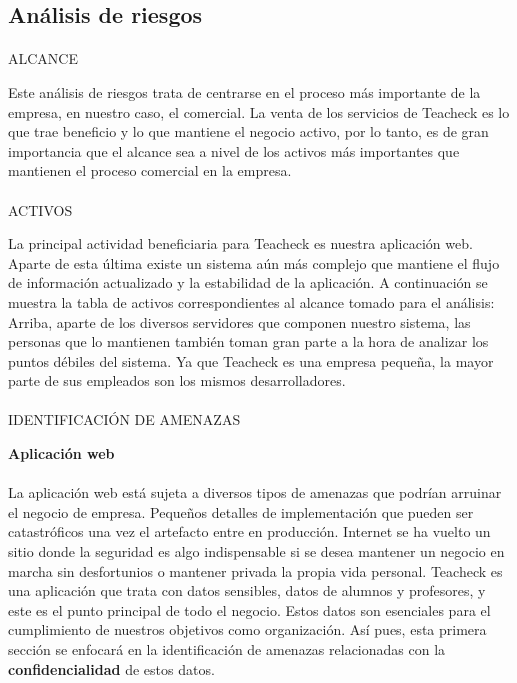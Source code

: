 \subsection{Análisis de riesgos}
\nocite{incibeAnalisisderiesgos}
\paragraph{}
ALCANCE

Este análisis de riesgos trata de centrarse en el proceso más
importante de la empresa, en nuestro caso, el comercial. La venta de
los servicios de Teacheck es lo que trae beneficio y lo que mantiene
el negocio activo, por lo tanto, es de gran importancia que el alcance
sea a nivel de los activos más importantes que mantienen el proceso
comercial en la empresa.

\paragraph{}
ACTIVOS

La principal actividad beneficiaria para Teacheck es nuestra
aplicación web. Aparte de esta última existe un sistema aún más
complejo que mantiene el flujo de información actualizado y la
estabilidad de la aplicación. A continuación se muestra la tabla de
activos correspondientes al alcance tomado para el análisis:
 Arriba,
aparte de los diversos servidores que componen nuestro sistema, las
personas que lo mantienen también toman gran parte a la hora de
analizar los puntos débiles del sistema. Ya que Teacheck es una
empresa pequeña, la mayor parte de sus empleados son los mismos
desarrolladores.

\paragraph{}
IDENTIFICACIÓN DE AMENAZAS

\textbf{Aplicación web}
\paragraph{}
La aplicación web está sujeta a diversos tipos de amenazas que podrían
arruinar el negocio de empresa. Pequeños detalles de implementación
que pueden ser catastróficos una vez el artefacto entre en
producción. Internet se ha vuelto un sitio donde la seguridad es algo
indispensable si se desea mantener un negocio en marcha sin
desfortunios o mantener privada la propia vida personal. Teacheck es
una aplicación que trata con datos sensibles, datos de alumnos y
profesores, y este es el punto principal de todo el negocio. Estos
datos son esenciales para el cumplimiento de nuestros objetivos como
organización. Así pues, esta primera sección se enfocará en la
identificación de amenazas relacionadas con la
\textbf{confidencialidad} de estos datos.

